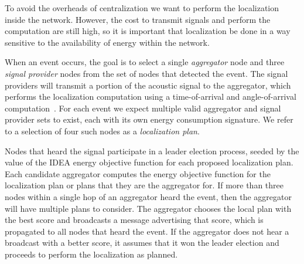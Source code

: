 To avoid the overheads of centralization we want to perform the localization
inside the network. However, the cost to transmit signals and perform the
computation are still high, so it is important that localization be done in a
way sensitive to the availability of energy within the network.

When an event occurs, the goal is to select a single \textit{aggregator} node
and three \textit{signal provider} nodes from the set of nodes that detected
the event. The signal providers will transmit a portion of the acoustic
signal to the aggregator, which performs the localization computation using a
time-of-arrival and angle-of-arrival computation~\cite{Niculescu03adhoc}.
For each event we expect multiple valid aggregator and signal provider sets
to exist, each with its own energy consumption signature. We refer to a
selection of four such nodes as a \textit{localization plan}. 

Nodes that heard the signal participate in a leader election process, seeded
by the value of the IDEA energy objective function for each proposed
localization plan. Each candidate aggregator computes the energy objective
function for the localization plan or plans that they are the aggregator for.
If more than three nodes within a single hop of an aggregator heard the
event, then the aggregator will have multiple plans to consider. The
aggregator chooses the local plan with the best score and broadcasts a
message advertising that score, which is propagated to all nodes that heard
the event. If the aggregator does not hear a broadcast with a better score,
it assumes that it won the leader election and proceeds to perform the
localization as planned. 
